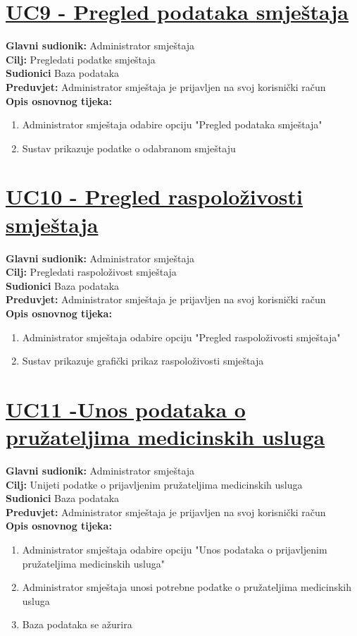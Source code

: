 \documentclass{article}
\begin{document}
	\section* {\underline{UC9 - Pregled podataka smještaja}}
	\textbf{Glavni sudionik:} Administrator smještaja \\
	\textbf{Cilj:} Pregledati podatke smještaja \\
	\textbf{Sudionici} Baza podataka \\
	\textbf{Preduvjet:} Administrator smještaja je prijavljen na svoj korisnički račun \\
	\textbf{Opis osnovnog tijeka:}
	\begin{enumerate}
		\item Administrator smještaja odabire opciju "Pregled podataka smještaja"
		\item Sustav prikazuje podatke o odabranom smještaju
	\end{enumerate}
	
	\section* {\underline{UC10 - Pregled raspoloživosti smještaja}}
	\textbf{Glavni sudionik:} Administrator smještaja \\
	\textbf{Cilj:} Pregledati raspoloživost smještaja \\
	\textbf{Sudionici} Baza podataka \\
	\textbf{Preduvjet:} Administrator smještaja je prijavljen na svoj korisnički račun \\
	\textbf{Opis osnovnog tijeka:}
	\begin{enumerate}
		\item Administrator smještaja odabire opciju "Pregled raspoloživosti smještaja"
		\item Sustav prikazuje grafički prikaz raspoloživosti smještaja
	\end{enumerate}
	
	\section* {\underline{UC11 -Unos podataka o pružateljima medicinskih usluga}}
	\textbf{Glavni sudionik:} Administrator smještaja \\
	\textbf{Cilj:} Unijeti podatke o prijavljenim pružateljima medicinskih usluga \\
	\textbf{Sudionici} Baza podataka \\
	\textbf{Preduvjet:} Administrator smještaja je prijavljen na svoj korisnički račun \\
	\textbf{Opis osnovnog tijeka:}
	\begin{enumerate}
		\item Administrator smještaja odabire opciju "Unos podataka o prijavljenim pružateljima medicinskih usluga"
		\item Administrator smještaja unosi potrebne podatke o pružateljima medicinskih usluga
		\item Baza podataka se ažurira
	\end{enumerate}
	
\end{document}
